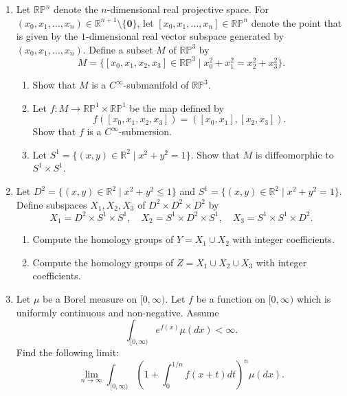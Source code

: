 \documentclass[10pt,a4paper]{article}
\begin{document}
\begin{enumerate}[label=\fbox{\arabic*}]
  \item %
        Let $\mathbb{RP}^n$ denote the $n$-dimensional real projective space. For $(x_0, x_1, \dots, x_n) \in \mathbb{R}^{n+1} \setminus \{\mathbf{0}\}$, let $[x_0, x_1, \dots, x_n] \in \mathbb{RP}^n$ denote the point that is given by the $1$-dimensional real vector subspace generated by $(x_0, x_1, \dots, x_n)$. Define a subset $M$ of $\mathbb{RP}^3$ by
        \[
          M = \{ [x_0, x_1, x_2, x_3] \in \mathbb{RP}^3 \mid x_0^2 + x_1^2 = x_2^2 + x_3^2 \}.
        \]
        \begin{enumerate}[label=(\arabic*)]
          \item Show that $M$ is a $C^\infty$-submanifold of $\mathbb{RP}^3$.
          \item Let $f : M \to \mathbb{RP}^1 \times \mathbb{RP}^1$ be the map defined by
          \[
            f([x_0, x_1, x_2, x_3]) = ([x_0, x_1], [x_2, x_3]).
          \]
          Show that $f$ is a $C^\infty$-submersion.
          \item Let $S^1 = \{ (x, y) \in \mathbb{R}^2 \mid x^2 + y^2 = 1 \}$. Show that $M$ is diffeomorphic to $S^1 \times S^1$.
        \end{enumerate}

  \item %
        Let $D^2 = \{ (x, y) \in \mathbb{R}^2 \mid x^2 + y^2 \le 1 \}$ and $S^1 = \{ (x, y) \in \mathbb{R}^2 \mid x^2 + y^2 = 1 \}$. Define subspaces $X_1, X_2, X_3$ of $D^2 \times D^2 \times D^2$ by
        \[
          X_1 = D^2 \times S^1 \times S^1, \quad X_2 = S^1 \times D^2 \times S^1, \quad X_3 = S^1 \times S^1 \times D^2.
        \]
        \begin{enumerate}[label=(\arabic*)]
          \item Compute the homology groups of $Y = X_1 \cup X_2$ with integer coefficients.
          \item Compute the homology groups of $Z = X_1 \cup X_2 \cup X_3$ with integer coefficients.
        \end{enumerate}

  \item %
        Let $\mu$ be a Borel measure on $[0, \infty)$. Let $f$ be a function on $[0, \infty)$ which is uniformly continuous and non-negative. Assume
        \[
          \int_{[0, \infty)} e^{f(x)} \mu(dx) < \infty.
        \]
        Find the following limit:
        \[
          \lim_{n \to \infty} \int_{[0, \infty)} \left( 1 + \int_0^{1/n} f(x+t) dt \right)^n \mu(dx).
        \]


\end{enumerate}
\end{document}

